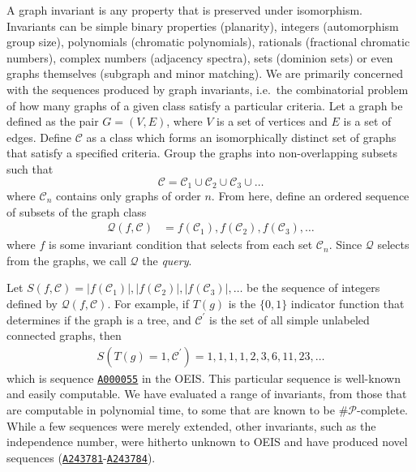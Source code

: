 \documentclass[12pt]{article}
\newcommand{\OEIS}[1]
{\href{https://oeis.org/#1}{\texttt{#1}}}
\newcommand{\SEQ}{S}
\newcommand{\QUERY}{\mathcal{Q}}
\newcommand{\CLASS}{\mathcal{C}}
\newcommand{\ie}[0]{i.e.\ }
\newcommand{\VARtree}{T}
\newcommand{\indicatorfunctionX}[1]{{#1}(g)}
\newcommand{\VARistree}
{\indicatorfunctionX{\VARtree}}
\begin{document}
A graph invariant is any property that is preserved under isomorphism. 
Invariants can be simple binary properties (planarity), integers (automorphism group size), polynomials (chromatic polynomials), rationals (fractional chromatic numbers), complex numbers (adjacency spectra), sets (dominion sets) or even graphs themselves (subgraph and minor matching). 
We are primarily concerned with the sequences produced by graph invariants, \ie the combinatorial problem of how many graphs of a given class satisfy a particular criteria.
Let a graph be defined as the pair $G = (V,E)$, where $V$ is a set of vertices and $E$ is a set of edges. 
Define $\CLASS$ as a class which forms an isomorphically distinct set of graphs that satisfy a specified criteria.
Group the graphs into non-overlapping subsets such that
\begin{equation}
\CLASS = \CLASS_1 \cup \CLASS_2 \cup \CLASS_3 \cup \ldots
\end{equation}
where $\CLASS_n$ contains only graphs of order $n$.
From here, define an ordered sequence of subsets of the graph class
%
\begin{align}
\QUERY(f, \CLASS) 
&= f(\CLASS_1), f(\CLASS_2), f(\CLASS_3), \ldots
\end{align}
%
where $f$ is some invariant condition that selects from each set $\CLASS_n$.
Since $\QUERY$ selects from the graphs, we call $\QUERY$ the \textit{query}.

Let 
$\SEQ(f, \CLASS) = |f(\CLASS_1)|, |f(\CLASS_2)|, |f(\CLASS_3)|, \ldots$
be the sequence of integers defined by $\QUERY(f, \CLASS)$. 
For example, if $\VARistree$ is the $\{0,1\}$ indicator function that determines if the graph is a tree, and $\CLASS^\prime$ is the set of all simple unlabeled connected graphs, then
%
\begin{align}
S(\VARistree=1, \CLASS^\prime) = 1, 1, 1, 1, 2, 3, 6, 11, 23, \ldots
\end{align}
%
which is sequence \OEIS{A000055} in the OEIS.
This particular sequence is well-known and easily computable.
We have evaluated a range of invariants, from those that are computable in polynomial time, to some that are known to be $\mathcal{\#P}$-complete.
While a few sequences were merely extended, other invariants, such as the independence number, were hitherto unknown to OEIS and have produced novel sequences (\OEIS{A243781}-\OEIS{A243784}).
\end{document}
